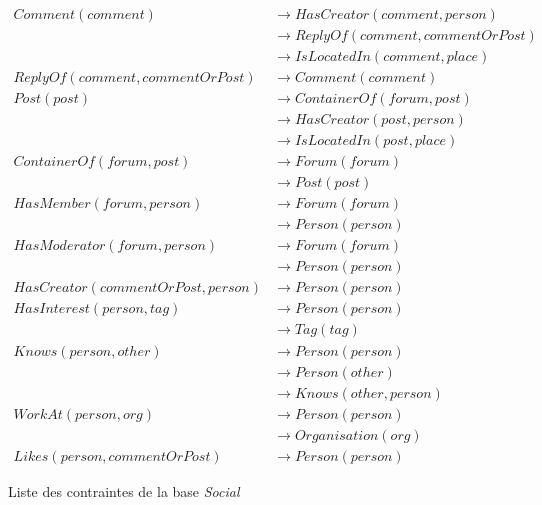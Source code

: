 \begin{figure}[H]
    \centering
    \begin{adjustbox}{max width=\linewidth,max height=.5\textheight}
        \parbox{\linewidth}{\begin{align*}
                Comment(comment)                  & \to HasCreator(comment, person)     \\
                                                  & \to ReplyOf(comment, commentOrPost) \\
                                                  & \to IsLocatedIn(comment, place)     \\
                ReplyOf(comment, commentOrPost)   & \to Comment(comment)                \\
                Post(post)                        & \to ContainerOf(forum, post)        \\
                                                  & \to HasCreator(post, person)        \\
                                                  & \to IsLocatedIn(post, place)        \\
                ContainerOf(forum, post)          & \to Forum(forum)                    \\
                                                  & \to Post(post)                      \\
                HasMember(forum, person)          & \to Forum(forum)                    \\
                                                  & \to Person(person)                  \\
                HasModerator(forum, person)       & \to Forum(forum)                    \\
                                                  & \to Person(person)                  \\
                HasCreator(commentOrPost, person) & \to Person(person)                  \\
                HasInterest(person, tag)          & \to Person(person)                  \\
                                                  & \to Tag(tag)                        \\
                Knows(person, other)              & \to Person(person)                  \\
                                                  & \to Person(other)                   \\
                                                  & \to Knows(other, person)            \\
                WorkAt(person, org)               & \to Person(person)                  \\
                                                  & \to Organisation(org)               \\
                Likes(person, commentOrPost)      & \to Person(person)
            \end{align*}}
    \end{adjustbox}
    \caption{Liste des contraintes de la base \emph{Social}}
\end{figure}


